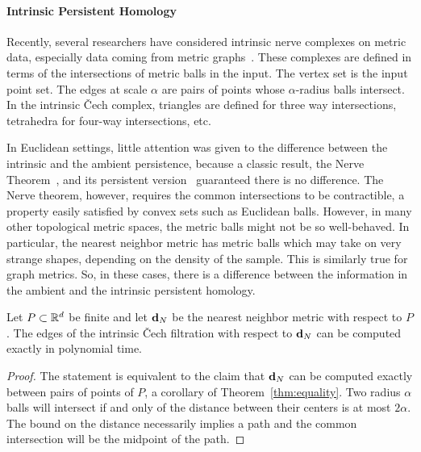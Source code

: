 

  \paragraph*{Intrinsic Persistent Homology}
    Recently, several researchers have considered intrinsic nerve complexes on metric data, especially data coming from metric graphs~\cite{adamszek16nerve,gasparovic17complete}.
    These complexes are defined in terms of the intersections of metric balls in the input.
    The vertex set is the input point set.
    The edges at scale $\alpha$ are pairs of points whose $\alpha$-radius balls intersect.
    In the intrinsic \v Cech complex, triangles are defined for three way intersections, tetrahedra for four-way intersections, etc.

    In Euclidean settings, little attention was given to the difference between the intrinsic and the ambient persistence, because a classic result, the Nerve Theorem~\cite{borsuk48imbedding}, and its persistent version~\cite{chazal08towards} guaranteed there is no difference.
    The Nerve theorem, however, requires the common intersections to be contractible, a property easily satisfied by convex sets such as Euclidean balls.
    However, in many other topological metric spaces, the metric
    balls might not be so well-behaved.
    In particular, the nearest neighbor metric has metric balls which may take on very strange shapes, depending on the density of the sample.
    This is similarly true for graph metrics.
    So, in these cases, there is a difference between the information in the ambient and the intrinsic persistent homology.

    \begin{theorem}
      Let $P\subset {\mathbb R}^d$ be finite and let $\mathbf{d}_N$ be the nearest neighbor metric with respect to $P$.
      The edges of the intrinsic \v Cech filtration with respect to $\mathbf{d}_N$ can be computed exactly in polynomial time.
    \end{theorem}
    \begin{proof}
      The statement is equivalent to the claim that $\mathbf{d}_N$ can be computed exactly between pairs of points of $P$, a corollary of Theorem~\ref{thm:equality}.
      Two radius $\alpha$ balls will intersect if and only of the distance between their centers is at most $2\alpha$.
      The bound on the distance necessarily implies a path and the common intersection will be the midpoint of the path.
    \end{proof}
